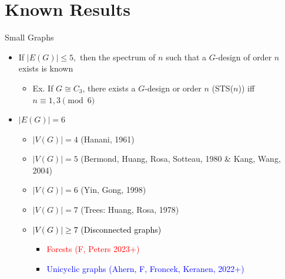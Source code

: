 \documentclass[11pt,serif,professionalfont,aspectratio=169]{beamer}
\theoremstyle{plain}
\begin{document}
\section{Known Results}
\begin{frame}{Small Graphs}
    \begin{itemize}
        \item If $|E(G)| \leq 5,$ then the spectrum of $n$ such that a $G$-design of order $n$ exists is known
        \begin{itemize}
            \item Ex. If $G\cong C_3$, there exists a $G$-design or order $n$ (STS($n$)) iff $n \equiv 1,3 \pmod 6$
        \end{itemize}
        \pause
        \item $|E(G)|=6$
        \begin{itemize}
            \item $|V(G)|=4$ (Hanani, 1961)
            \item $|V(G)|=5$ (Bermond, Huang, Rosa, Sotteau, 1980 \& Kang, Wang, 2004)
            \item $|V(G)|=6$ (Yin, Gong, 1998)
            \item $|V(G)|=7$ (Trees: Huang, Rosa, 1978) 
            \pause
            \item \textcolor{black}{$|V(G)|\geq 7$ (Disconnected graphs)}
             \begin{itemize}
        \item \textcolor{red}{Forests (F, Peters 2023+)}
        \item \textcolor{blue}{Unicyclic graphs (Ahern, F, Froncek, Keranen, 2022+)}
    \end{itemize}
        \end{itemize}
    \end{itemize}
\end{frame}

\end{document}
